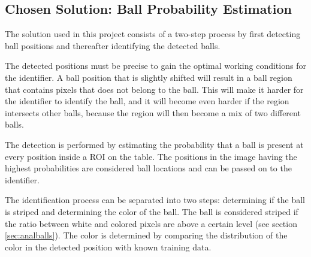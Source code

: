 \subsection{Chosen Solution: Ball Probability Estimation}
The solution used in this project consists of a two-step process by first detecting ball positions and thereafter identifying the detected balls.

The detected positions must be precise to gain the optimal working conditions for the identifier. A ball position that is slightly shifted will result in a ball region that contains pixels that does not belong to the ball. This will make it harder for the identifier to identify the ball, and it will become even harder if the region intersects other balls, because the region will then become a mix of two different balls. 

The detection is performed by estimating the probability that a ball is present at every position inside a ROI on the table. The positions in the image having the highest probabilities are considered ball locations and can be passed on to the identifier.

The identification process can be separated into two steps: determining if the ball is striped and determining the color of the ball. The ball is considered striped if the ratio between white and colored pixels are above a certain level (see section \ref{sec:analballs}). The color is determined by comparing the distribution of the color in the detected position with known training data.